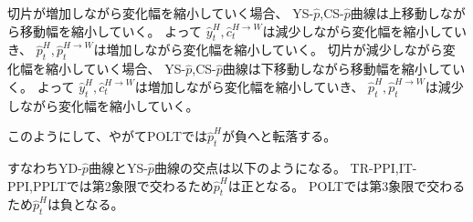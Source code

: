 \begin{enumerate}
\begin{description}[style=nextline]
                切片が増加しながら変化幅を縮小していく場合、
                YS-\(\hat{p}\),CS-\(\hat{p}\)曲線は上移動しながら移動幅を縮小していく。
                よって
                \(\hat{y}_t^H,\hat{c}_t^{H\to W}\)は減少しながら変化幅を縮小していき、
                \(\hat{p}_t^H,\hat{p}_t^{H\to W}\)は増加しながら変化幅を縮小していく。
                切片が減少しながら変化幅を縮小していく場合、
                YS-\(\hat{p}\),CS-\(\hat{p}\)曲線は下移動しながら移動幅を縮小していく。
                よって
                \(\hat{y}_t^H,\hat{c}_t^{H\to W}\)は増加しながら変化幅を縮小していき、
                \(\hat{p}_t^H,\hat{p}_t^{H\to W}\)は減少しながら変化幅を縮小していく。

                このようにして、やがてPOLTでは\(\hat{p}_t^H\)が負へと転落する。
                
                すなわちYD-\(\hat{p}\)曲線とYS-\(\hat{p}\)曲線の交点は以下のようになる。
                TR-PPI,IT-PPI,PPLTでは第2象限で交わるため\(\hat{p}_t^H\)は正となる。
                POLTでは第3象限で交わるため\(\hat{p}_t^H\)は負となる。


\end{description}
\end{enumerate}
